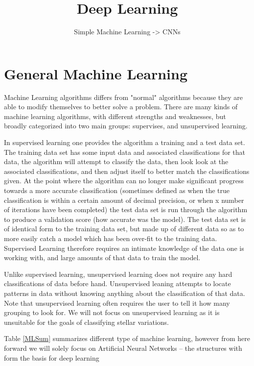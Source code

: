 \documentclass[a4paper]{article}
\title{Deep Learning}
\author{Simple Machine Learning -> CNNs }
\begin{document}
\maketitle
\section{General Machine Learning}
Machine Learning algorithms differs from "normal" algorithms because they are able to modify themselves to better solve a problem. There are many kinds of machine learning algorithms, with different strengths and weaknesses, but broadly categorized into two main groups: supervises, and unsupervised learning.

In supervised learning one provides the algorithm a training and a test data set. The training data set has some input data and associated classifications for that data, the algorithm will attempt to classify the data, then look look at the associated classifications, and then adjust itself to better match the classifications given. At the point where the algorithm can no longer make significant progress towards a more accurate classification (sometimes defined as when the true classification is within a certain amount of decimal precision, or when x number of iterations have been completed) the test data set is run through the algorithm to produce a validation score (how accurate was the model). The test data set is of identical form to the training data set, but made up of different data so as to more easily catch a model which has been over-fit to the training data. Supervised Learning therefore requires an intimate knowledge of the data one is working with, and large amounts of that data to train the model.

Unlike supervised learning, unsupervised learning does not require any hard classifications of data before hand. Unsupervised leaning attempts to locate patterns in data without knowing anything about the classification of that data. Note that unsupervised learning often requires the user to tell it how many grouping to look for. We will not focus on unsupervised learning as it is unsuitable for the goals of classifying stellar variations.

Table \ref{MLSum} summarizes different type of machine learning, however from here forward we will solely focus on Artificial Neural Networks -- the structures with form the basis for deep learning
\end{document}
